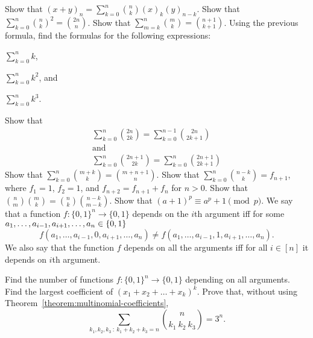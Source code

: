 \begin{chapterendexercises}
  \exercise Show that
    $(x + y)_n = \sum_{k = 0}^n \binom{n}{k} (x)_k (y)_{n - k}$.
  \exercise Show that
    $\sum_{k = 0}^n \binom{n}{k}^2 = \binom{2n}{n}$.
  \exercise Show that $\sum_{m = k}^n \binom{m}{k} =
    \binom{n + 1}{k + 1}$.
  \exercise Using the previous formula, find the formulas for the following
    expressions:
    \begin{enumerate*}
      \item $\sum_{k = 0}^n k$,
      \item $\sum_{k = 0}^n k^2$, and
      \item $\sum_{k = 0}^n k^3$.
    \end{enumerate*}
  \exercise Show that
    \begin{gather*}
      \sum_{k = 0}^{n} \binom{2n}{2k} =
      \sum_{k = 0}^{n - 1} \binom{2n}{2k + 1} \\
      \text{and} \\
      \sum_{k = 0}^{n} \binom{2n + 1}{2k} =
      \sum_{k = 0}^n \binom{2n + 1}{2k + 1}
    \end{gather*}
  \exercise[recommended] Show that $\sum_{k = 0}^n \binom{m + k}{k} =
    \binom{m + n + 1}{n}$.
  \exercise Show that $\sum_{k = 0}^n \binom{n - k}{k} = f_{n + 1}$,
    where $f_1 = 1$, $f_2 = 1$, and $f_{n + 2} = f_{n + 1} + f_n$ for $n > 0$.
  \exercise Show that $\binom{n}{m} \binom{m}{k} =
    \binom{n}{k} \binom{n - k}{m - k}$.
  \exercise[recommended] Show that
    $(a + 1)^p \equiv a^p + 1 \pmod{p}$.
  \exercise[recommended] We say that a function $f : \{0, 1\}^n \to \{0, 1\}$ depends on the
    $i$th argument iff for some
    $a_1, \dots, a_{i - 1}, a_{i + 1}, \dots, a_n \in \set{0, 1}$
    \[
      f(a_1, \dots, a_{i - 1}, 0, a_{i + 1}, \dots, a_n) \neq
      f(a_1, \dots, a_{i - 1}, 1, a_{i + 1}, \dots, a_n).
    \]
    We also say that the function $f$ depends on all the arguments iff for all
    $i \in [n]$ it depends on $i$th argument.

    Find the number of functions $f : \{0, 1\}^n \to \{0, 1\}$ depending on all
    arguments.
  \exercise Find the largest coefficient of $(x_1 + x_2 + \dots + x_k)^k$.
  \exercise Prove that,
    without using Theorem~\ref{theorem:multinomial-coefficients},
    \[
      \sum_{k_1, k_2, k_3 ~:~ k_1 + k_2 + k_3 = n} \binom{n}{k_1 \ k_2 \ k_3} =
      3^n.
    \]
\end{chapterendexercises}
